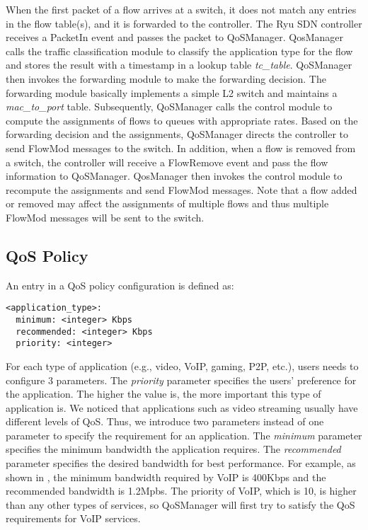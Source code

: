 When the first packet of a flow arrives at a switch, it does not match any entries in the flow table(s), and
it is forwarded to the controller. The Ryu SDN controller receives a \textsf{PacketIn} event and passes the
packet to QoSManager. QosManager calls the traffic classification module to classify the application type for
the flow and stores the result with a timestamp in a lookup table \emph{tc\_table}. QoSManager then invokes
the forwarding module to make the forwarding decision. The forwarding module basically implements a simple L2
switch and maintains a \emph{mac\_to\_port} table. Subsequently, QoSManager calls the control module to compute
the assignments of flows to queues with appropriate rates. Based on the forwarding decision and the assignments,
QoSManager directs the controller to send \textsf{FlowMod} messages to the switch. In addition, when a flow is
removed from a switch, the controller will receive a \textsf{FlowRemove} event and pass the flow information to
QoSManager. QosManager then invokes the control module to recompute the assignments and send \textsf{FlowMod}
messages. Note that a flow added or removed may affect the assignments of multiple flows and thus multiple
\textsf{FlowMod} messages will be sent to the switch. 

\subsection{QoS Policy}
\label{sect:qosPolicy}

An entry in a QoS policy configuration is defined as:

\begin{lstlisting}[basicstyle=\sffamily]
<application_type>:
  minimum: <integer> Kbps
  recommended: <integer> Kbps
  priority: <integer>
\end{lstlisting}

For each type of application (e.g., video, VoIP, gaming, P2P, etc.), users needs to configure 3 parameters. The \emph{priority}
parameter specifies the users' preference for the application. The higher the value is, the more important this type of
application is. We noticed that applications such as video streaming usually have different levels of QoS. Thus, we introduce two
parameters instead of one parameter to specify the requirement for an application. The \emph{minimum} parameter specifies
the minimum bandwidth the application requires. The \emph{recommended} parameter specifies the desired bandwidth for best
performance. For example, as shown in , the minimum bandwidth required by VoIP is 400Kbps and the recommended
bandwidth is 1.2Mpbs. The priority of VoIP, which is 10, is higher than any other types of services, so QoSManager will first try to
satisfy the QoS requirements for VoIP services.

